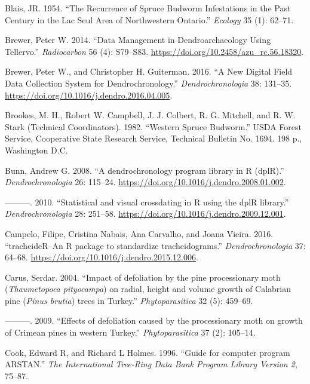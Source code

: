 \documentclass[review]{elsarticle} %
\begin{document}
\leavevmode\hypertarget{ref-Blais1954}{}%
Blais, JR. 1954. ``The Recurrence of Spruce Budworm Infestations in the Past Century in the Lac Seul Area of Northwestern Ontario.'' \emph{Ecology} 35 (1): 62--71.

\leavevmode\hypertarget{ref-Brewer2014}{}%
Brewer, Peter W. 2014. ``Data Management in Dendroarchaeology Using Tellervo.'' \emph{Radiocarbon} 56 (4): S79--S83. \url{https://doi.org/10.2458/azu_rc.56.18320}.

\leavevmode\hypertarget{ref-Brewer2016}{}%
Brewer, Peter W., and Christopher H. Guiterman. 2016. ``A New Digital Field Data Collection System for Dendrochronology.'' \emph{Dendrochronologia} 38: 131--35. \url{https://doi.org/10.1016/j.dendro.2016.04.005}.

\leavevmode\hypertarget{ref-Brookes1987}{}%
Brookes, M. H., Robert W. Campbell, J. J. Colbert, R. G. Mitchell, and R. W. Stark (Technical Coordinators). 1982. ``Western Spruce Budworm.'' USDA Forest Service, Cooperative State Research Service, Technical Bulletin No. 1694. 198 p., Washington D.C.

\leavevmode\hypertarget{ref-Bunn2008}{}%
Bunn, Andrew G. 2008. ``A dendrochronology program library in R (dplR).'' \emph{Dendrochronologia} 26: 115--24. \url{https://doi.org/10.1016/j.dendro.2008.01.002}.

\leavevmode\hypertarget{ref-Bunn2010}{}%
---------. 2010. ``Statistical and visual crossdating in R using the dplR library.'' \emph{Dendrochronologia} 28: 251--58. \url{https://doi.org/10.1016/j.dendro.2009.12.001}.

\leavevmode\hypertarget{ref-Campelo2016}{}%
Campelo, Filipe, Cristina Nabais, Ana Carvalho, and Joana Vieira. 2016. ``tracheideR--An R package to standardize tracheidograms.'' \emph{Dendrochronologia} 37: 64--68. \url{https://doi.org/10.1016/j.dendro.2015.12.006}.

\leavevmode\hypertarget{ref-Carus2004}{}%
Carus, Serdar. 2004. ``Impact of defoliation by the pine processionary moth (\emph{Thaumetopoea pityocampa}) on radial, height and volume growth of Calabrian pine (\emph{Pinus brutia}) trees in Turkey.'' \emph{Phytoparasitica} 32 (5): 459--69.

\leavevmode\hypertarget{ref-Carus2009}{}%
---------. 2009. ``Effects of defoliation caused by the processionary moth on growth of Crimean pines in western Turkey.'' \emph{Phytoparasitica} 37 (2): 105--14.

\leavevmode\hypertarget{ref-arstan}{}%
Cook, Edward R, and Richard L Holmes. 1996. ``Guide for computer program ARSTAN.'' \emph{The International Tree-Ring Data Bank Program Library Version 2}, 75--87.
\end{document}

